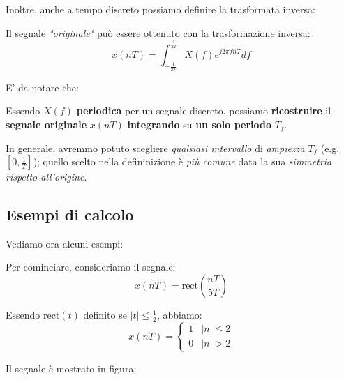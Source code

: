 Inoltre, anche a tempo discreto possiamo definire la trasformata inversa:

\begin{definition}
    Il segnale \textit{"originale"} può essere ottenuto con la trasformazione inversa:
    \[
        x(nT) = \int_{- \frac{1}{2T}}^{\frac{1}{2T}} X(f) e^{j 2\pi fnT} df
    \] 
\end{definition}

E' da notare che:

\begin{remark}
    Essendo $X(f)$ \textbf{periodica} per un segnale discreto, possiamo \textbf{ricostruire}
    il \textbf{segnale originale} $x(nT)$ \textbf{integrando} su 
    \textbf{un solo periodo} $T_f$.

    In generale, avremmo potuto scegliere \textit{qualsiasi intervallo} di 
    \textit{ampiezza} $T_f$ (e.g. $[0, \frac{1}{T}]$); quello scelto nella 
    defininizione è \textit{più comune} data la sua \textit{simmetria rispetto
    all'origine}.
\end{remark}

\subsection{Esempi di calcolo}

Vediamo ora alcuni esempi:

Per cominciare, consideriamo il segnale:
\[
    x(nT) = \text{rect} \left(\frac{nT}{5T} \right)
\]

Essendo $\text{rect}(t)$ definito se $|t|\le \frac{1}{2}$, abbiamo:
\[
    x(nT) = \begin{cases}
        1 & |n| \le 2 \\ 
        0 & |n| > 2
    \end{cases}
\]

Il segnale è mostrato in figura:

